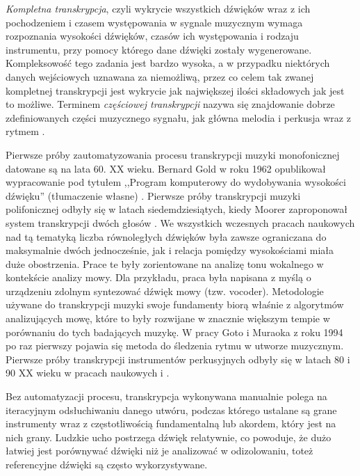 \documentclass[12pt,a4paper,twoside]{mwart}
\begin{document}
\textit{Kompletna transkrypcja}, czyli wykrycie wszystkich dźwięków wraz z ich pochodzeniem i czasem występowania w sygnale muzycznym wymaga rozpoznania wysokości dźwięków, czasów ich występowania i rodzaju instrumentu, przy pomocy którego dane dźwięki zostały wygenerowane. Kompleksowość tego zadania jest bardzo wysoka, a w przypadku niektórych danych wejściowych uznawana za niemożliwą, przez co celem tak zwanej kompletnej transkrypcji jest wykrycie jak największej ilości składowych jak jest to możliwe. Terminem \textit{częściowej transkrypcji} nazywa się znajdowanie dobrze zdefiniowanych części muzycznego sygnału, jak główna melodia i perkusja wraz z rytmem \cite[3-7]{Transcription:Anssi:SignalProcessingMethods}.

Pierwsze próby zautomatyzowania procesu transkrypcji muzyki monofonicznej datowane są na lata 60. XX wieku. Bernard Gold w roku 1962 opublikował wypracowanie pod tytułem ,,Program komputerowy do wydobywania wysokości dźwięku'' (tłumaczenie własne) \cite{Transcription:Gold:ComputerProgramForPitchExtraction}. Pierwsze próby transkrypcji muzyki polifonicznej odbyły się w latach siedemdziesiątych, kiedy Moorer zaproponował system transkrypcji dwóch głosów \cite{Transcription:Moorer:SegmentationAndAnalysis}\cite{Transcription:Moorer:OnTheTranscriptionOfMusicalSOundByComputer}. We wszystkich wczesnych pracach naukowych nad tą tematyką liczba równoległych dźwięków była zawsze ograniczana do maksymalnie dwóch jednocześnie, jak i relacja pomiędzy wysokościami miała duże obostrzenia. Prace te były zorientowane na analizę tonu wokalnego w kontekście analizy mowy. Dla przykładu, praca \cite{Transcription:Gold:ComputerProgramForPitchExtraction} była napisana z myślą o urządzeniu zdolnym syntezować dźwięk mowy (tzw. vocoder). Metodologie używane do transkrypcji muzyki swoje fundamenty biorą właśnie z algorytmów analizujących mowę, które to były rozwijane w znacznie większym tempie w porównaniu do tych badających muzykę. W pracy Goto i Muraoka z roku 1994 \cite{Transcription::FirstRythm} po raz pierwszy pojawia się metoda do śledzenia rytmu w utworze muzycznym. Pierwsze próby transkrypcji instrumentów perkusyjnych odbyły się w latach 80 i 90 XX wieku w pracach naukowych \cite[99-104]{Transcription:Schloss:AutomaticTranscriptionOfPercussiveMusic} i \cite[77-84]{Transcription:Bilmes:TimingIsOfTHeEssence} \cite[6]{Transcription:Anssi:SignalProcessingMethods}.

Bez automatyzacji procesu, transkrypcja wykonywana manualnie polega na iteracyjnym odsłuchiwaniu danego utwóru, podczas którego ustalane są grane instrumenty wraz z częstotliwością fundamentalną lub akordem, który jest na nich grany.  Ludzkie ucho postrzega dźwięk relatywnie, co powoduje, że dużo łatwiej jest porównywać dźwięki niż je analizować w odizolowaniu, toteż referencyjne dźwięki są często wykorzystywane.
\end{document}
